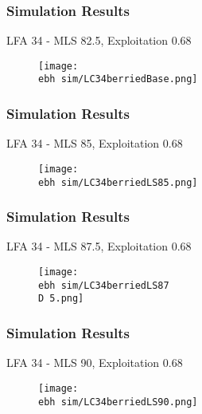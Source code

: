 \documentclass{beamer}
\newcommand{\ebh}{\string~/bio.data/bio.lobster/figures/LFA3438Framework2019/} %
\newcommand{\D}{.}
\begin{document}
\begin{frame}
\frametitle{Simulation Results}
LFA 34 - MLS 82.5, Exploitation 0.68
\begin{figure}
        \begin{center}
            \texttt{[image: \\ebh sim/LC34berriedBase.png]}
        \end{center}
    \end{figure}
\end{frame}



\begin{frame}
\frametitle{Simulation Results}
LFA 34 - MLS 85, Exploitation 0.68
\begin{figure}
        \begin{center}
            \texttt{[image: \\ebh sim/LC34berriedLS85.png]}
        \end{center}
    \end{figure}
\end{frame}


\begin{frame}
\frametitle{Simulation Results}
LFA 34 - MLS 87.5, Exploitation 0.68
\begin{figure}
        \begin{center}
            \texttt{[image: \\ebh sim/LC34berriedLS87\\D 5.png]}
        \end{center}
    \end{figure}
\end{frame}


\begin{frame}
\frametitle{Simulation Results}
LFA 34 - MLS 90, Exploitation 0.68
\begin{figure}
        \begin{center}
            \texttt{[image: \\ebh sim/LC34berriedLS90.png]}
        \end{center}
    \end{figure}
\end{frame}





\end{document}
